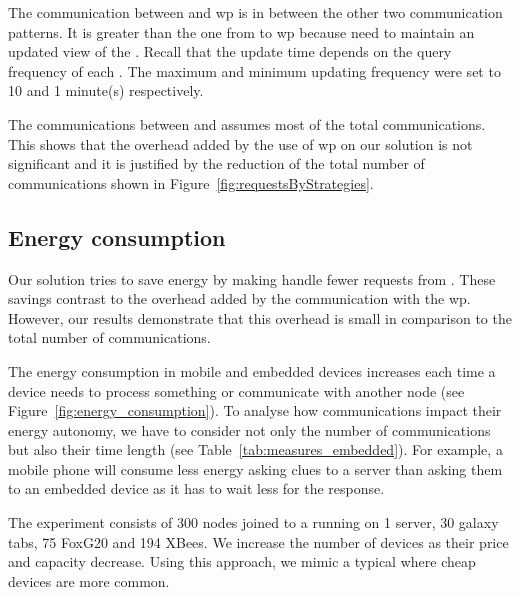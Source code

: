 The communication between \consumers{} and \ac{wp} is in between the other two communication patterns.
It is greater than the one from \providers{} to \ac{wp} because \consumers{} need to maintain an updated view of the \Space{}.
Recall that the update time depends on the query frequency of each \consumer{}.
The maximum and minimum updating frequency were set to 10 and 1 minute(s) respectively.

The communications between \consumers{} and \providers{} assumes most of the total communications.
This shows that the overhead added by the use of \ac{wp} on our solution is not significant and it is justified by the reduction of the total number of communications shown in Figure~\ref{fig:requestsByStrategies}.





\subsection{Energy consumption}
\label{sec:energyConsumption}
Our solution tries to save energy by making \providers{} handle fewer requests from \consumers{}.
These savings contrast to the overhead added by the communication with the \ac{wp}.
However, our results demonstrate that this overhead is small in comparison to the total number of communications.

The energy consumption in mobile and embedded devices increases each time a device needs to process something or communicate with another node (see Figure~\ref{fig:energy_consumption}).
To analyse how communications impact their energy autonomy, we have to consider not only the number of communications but also their time length (see Table~\ref{tab:measures_embedded}).
For example, a mobile phone will consume less energy asking clues to a server than asking them to an embedded device as it has to wait less for the response.




The experiment consists of 300 nodes joined to a \Space{} running on 1 server, 30 galaxy tabs, 75 FoxG20 and 194 XBees.
We increase the number of devices as their price and capacity decrease.
Using this approach, we mimic a typical \Space{} where cheap devices are more common.

